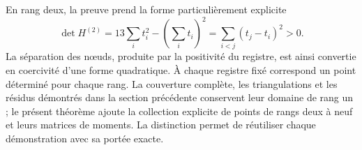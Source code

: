 En rang deux, la preuve prend la forme particulièrement explicite
\[
 \det H^{(2)}=13\sum_i t_i^2-\left(\sum_i t_i\right)^2
 =\sum_{i<j}(t_j-t_i)^2>0.
\]
La séparation des nœuds, produite par la positivité du registre, est ainsi convertie en coercivité d'une forme quadratique. À chaque registre fixé correspond un point déterminé pour chaque rang. La couverture complète, les triangulations et les résidus démontrés dans la section précédente conservent leur domaine de rang un ; le présent théorème ajoute la collection explicite de points de rangs deux à neuf et leurs matrices de moments. La distinction permet de réutiliser chaque démonstration avec sa portée exacte.
